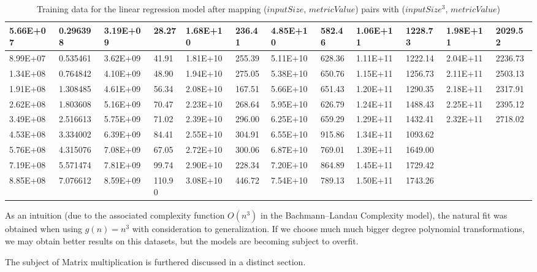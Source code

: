 \begin{table}[H]
\begin{center}
{\begin{tabular}{|l|l|l|l|l|l|l|l|l|l|l|l|}
5.66E+07  & 0.296398 & 3.19E+09  & 28.27  & 1.68E+10  & 236.41 & 4.85E+10  & 582.46 & 1.06E+11  & 1228.73 & 1.98E+11  & 2029.52 \\ \hline
8.99E+07  & 0.535461 & 3.62E+09  & 41.91  & 1.81E+10  & 255.39 & 5.11E+10  & 628.36 & 1.11E+11  & 1222.14 & 2.04E+11  & 2236.73 \\ \hline
1.34E+08  & 0.764842 & 4.10E+09  & 48.90  & 1.94E+10  & 275.05 & 5.38E+10  & 650.76 & 1.15E+11  & 1256.73 & 2.11E+11  & 2503.13 \\ \hline
1.91E+08  & 1.308485 & 4.61E+09  & 56.34  & 2.08E+10  & 167.51 & 5.66E+10  & 651.43 & 1.20E+11  & 1290.35 & 2.18E+11  & 2317.91 \\ \hline
2.62E+08  & 1.803608 & 5.16E+09  & 70.47  & 2.23E+10  & 268.64 & 5.95E+10  & 626.79 & 1.24E+11  & 1488.43 & 2.25E+11  & 2395.12 \\ \hline
3.49E+08  & 2.516613 & 5.75E+09  & 71.02  & 2.39E+10  & 296.00 & 6.25E+10  & 659.29 & 1.29E+11  & 1432.41 & 2.32E+11  & 2718.02 \\ \hline
4.53E+08  & 3.334002 & 6.39E+09  & 84.41  & 2.55E+10  & 304.91 & 6.55E+10  & 915.86 & 1.34E+11  & 1093.62 &           &         \\ \hline
5.76E+08  & 4.315076 & 7.08E+09  & 67.05  & 2.72E+10  & 300.06 & 6.87E+10  & 769.01 & 1.39E+11  & 1649.00 &           &         \\ \hline
7.19E+08  & 5.571474 & 7.81E+09  & 99.74  & 2.90E+10  & 228.34 & 7.20E+10  & 864.89 & 1.45E+11  & 1729.42 &           &         \\ \hline
8.85E+08  & 7.076612 & 8.59E+09  & 110.90 & 3.08E+10  & 446.72 & 7.54E+10  & 789.13 & 1.50E+11  & 1743.26 &           &         \\ \hline
\end{tabular}
}
\end{center}
\caption{Training data for the linear regression model after mapping ($inputSize$, $metricValue$) pairs with ($inputSize^3$, $metricValue$)}
\end{table}


As an intuition (due to the associated complexity function $O(n^3)$ in the Bachmann–Landau Complexity model), the natural fit was obtained when using $g(n) = n^3$ with consideration to generalization. If we choose much much bigger degree polynomial transformations, we may obtain better results on this datasets, but the models are becoming subject to overfit. 

The subject of Matrix multiplication is furthered discussed in a distinct section. 

